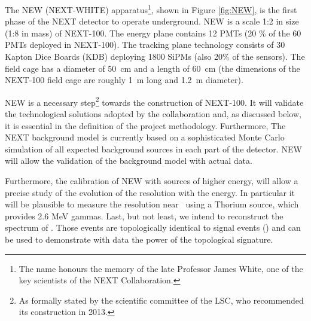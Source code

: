 The NEW (NEXT-WHITE) apparatus\footnote{The name honours the memory of the late Professor James White, one of the key scientists of the NEXT Collaboration.}, shown in Figure \ref{fig:NEW}, is the first phase of the NEXT detector to operate underground. NEW 
%
%
is a scale 1:2 in size (1:8 in mass) of NEXT-100. The energy plane contains 12 PMTs (20 \% of the 60 PMTs deployed in NEXT-100). The tracking plane technology consists of 30 Kapton Dice Boards (KDB) deploying 1800 SiPMs (also 20\% of the sensors). The field cage has a diameter of 50~cm and a length of 60~cm (the dimensions of the NEXT-100 field cage are roughly 1~m long and 1.2~m diameter). 

NEW is a necessary step\footnote{As formally stated by the scientific committee of the LSC, who recommended its construction in 2013.} towards the construction of NEXT-100. It will validate the technological solutions adopted by the collaboration and, as discussed below, it is essential in the definition of the project methodology. Furthermore, The NEXT background model is currently based on a sophisticated Monte Carlo simulation of all expected background sources in each part of the detector. NEW will allow the validation of the background model with actual data. 

Furthermore, the calibration of NEW with 
sources of higher energy, will allow a precise study of the evolution of the resolution with the energy. 
In particular it will be plausible to measure the resolution near \Qbb\ using a Thorium source, which provides 2.6 MeV gammas. Last, but not least, we intend to 
reconstruct the spectrum of \bbtnu. Those events are topologically identical to signal events (\bbonu) and can be used to demonstrate with data the power of the topological signature. 
%

